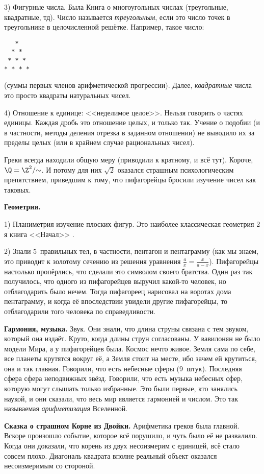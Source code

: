 \documentclass[a4paper,oneside,fleqn,10pt]{article}
\begin{document}
3) Фигурные числа. Была Книга о многоугольных числах (треугольные, квадратные, тд).
Число называется \emph{треугольным}, если это число точек в треугольнике в целочисленной решётке.
Например, такое число:
\begin{verbatim}
   *
  * *
 * * *
* * * *
\end{verbatim}
(суммы первых членов арифметической прогрессии).
Далее, \emph{квадратные} числа это просто квадраты натуральных чисел.

4) Отношение к единице: <<неделимое целое>>. Нельзя говорить о частях единицы.
Каждая дробь это отношение целых,  и только так.
Учение о подобии (и в частности, методы деления отрезка в заданном отношении) не выводило
их за пределы целых (или в крайнем случае рациональных чисел).

Греки всегда находили общую меру (приводили к кратному, и всё тут).
Короче, $\Q = \Z^2/\mskip-5mu\sim$.
И потому для них $\sqrt2$ оказался страшным психологическим препятствием, приведшим
к тому, что пифагорейцы бросили изучение чисел как таковых.

\textbf{Геометрия.}

1) Планиметрия изучение плоских фигур.
Это наиболее классическая геометрия 2 я книга <<Начал>> .

2) Знали 5~правильных тел, в частности, пентагон и пентаграмму (как мы знаем, это
приводит к золотому сечению из решения уравнения $\frac ax = \frac x{a-x}$).
Пифагорейцы настолько пропёрлись, что сделали это символом своего братства.
Один раз так получилось, что одного из пифагорейцев выручил какой-то человек,
но отблагодарить было нечем. Тогда пифагореец нарисовал на воротах дома пентаграмму,
и когда её впоследствии увидели другие пифагорейцы, то отблагодарили того человека по
справедливости.

\textbf{Гармония, музыка.} Звук. Они знали, что длина струны связана с тем звуком, который она издаёт.
Круто, когда длины струн согласованы. У вавилонян не было модели Мира, а у пифагорейцев была.
Космос нечто живое. Земля сама по себе, все планеты крутятся вокруг её,
а Земля стоит на месте, ибо зачем ей крутиться, она и так главная. Говорили, что есть небесные сферы
(9~штук). Последняя сфера сфера неподвижных звёзд.
Говорили, что есть музыка небесных сфер, которую могут слышать только избранные.
Это были первые, кто занялись наукой, и они сказали, что весь мир является гармонией и числом.
Это так называемая \emph{арифметизация} Вселенной.

\textbf{Сказка о страшном Корне из Двойки.}
Арифметика греков была главной. Вскоре произошло событие, которое всё порушило, и чуть было её не
развалило. Когда они доказали, что корень из двух несоизмерим с единицей, всё стало совсем плохо.
Диагональ квадрата вполне реальный объект оказался несоизмеримым со стороной.
\end{document}
